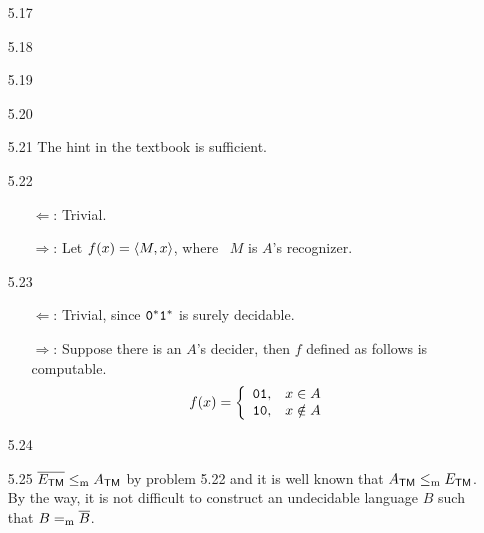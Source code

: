 \begin{itemize}
	\item[5.17]
	\Empty
	
	\item[5.18]
	\Empty
	
	\item[5.19]
	\Empty
	
	\item[5.20]
	\Empty
	
	\item[5.21]
	The hint in the textbook is sufficient.
	
	\item[5.22]
	\begin{itemize}
		\item[$\Leftarrow$:] Trivial.
		\item[$\Rightarrow$:] Let $f(x) = \Bra{M, x}$, where \TM\ $M$ is $A$'s recognizer. 
	\end{itemize}

	\item[5.23]
	\begin{itemize}
		\item[$\Leftarrow$:] Trivial, since $\TT{0}^*\TT{1}^*$ is surely decidable.
		\item[$\Rightarrow$:] Suppose there is an $A$'s decider, then $f$ defined as follows is computable.
		\[
			f(x) = 
			\left\{
				\begin{array}{ll}
					\TT{01}, & x \in A \\
					\TT{10}, & x \notin A
				\end{array}
			\right.
		\]
	\end{itemize}

	\item[5.24]
	\Empty
	
	\item[5.25]
	$\overline{E_{\TM}} \Leqm A_{\TM}$ by problem 5.22 and it is well known that $A_{\TM} \Leqm E_{\TM}$. By the way, it is not difficult to construct an undecidable language $B$ such that $B =_{\RM{m}} \overline{B}$.
	
\end{itemize}